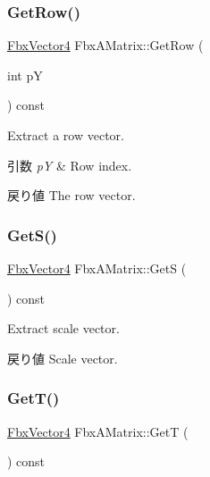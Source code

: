 \mbox{\label{class_fbx_a_matrix_ac9390e435954f95cee145123452ace46}} 
\subsubsection{\texorpdfstring{Get\+Row()}{GetRow()}}
{\footnotesize\ttfamily \hyperlink{class_fbx_vector4}{Fbx\+Vector4} Fbx\+A\+Matrix\+::\+Get\+Row (\begin{DoxyParamCaption}\item[{int}]{pY }\end{DoxyParamCaption}) const}

Extract a row vector. 
\begin{DoxyParams}{引数}
{\em pY} & Row index. \\
\hline
\end{DoxyParams}
\begin{DoxyReturn}{戻り値}
The row vector. 
\end{DoxyReturn}
\mbox{\label{class_fbx_a_matrix_a2d5efe3883f4a41c8ff8c223b5835fa1}} 
\subsubsection{\texorpdfstring{Get\+S()}{GetS()}}
{\footnotesize\ttfamily \hyperlink{class_fbx_vector4}{Fbx\+Vector4} Fbx\+A\+Matrix\+::\+GetS (\begin{DoxyParamCaption}{ }\end{DoxyParamCaption}) const}

Extract scale vector. \begin{DoxyReturn}{戻り値}
Scale vector. 
\end{DoxyReturn}
\mbox{\label{class_fbx_a_matrix_adbf66581dbcec6acb82b3721a0394c88}} 
\subsubsection{\texorpdfstring{Get\+T()}{GetT()}}
{\footnotesize\ttfamily \hyperlink{class_fbx_vector4}{Fbx\+Vector4} Fbx\+A\+Matrix\+::\+GetT (\begin{DoxyParamCaption}{ }\end{DoxyParamCaption}) const}

